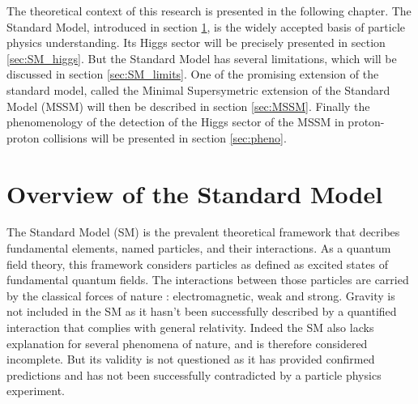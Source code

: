




The theoretical context of this research is presented in the following chapter. The Standard Model, introduced in section \ref{sec:SM}, is the widely accepted basis of particle physics understanding. Its Higgs sector will be precisely presented in section \ref{sec:SM_higgs}. But the Standard Model has several limitations, which will be discussed in section \ref{sec:SM_limits}. One of the promising extension of the standard model, called the Minimal Supersymetric extension of the Standard Model (MSSM) will then be described in section \ref{sec:MSSM}. Finally the phenomenology of the detection of the Higgs sector of the MSSM in proton-proton collisions will be presented in section \ref{sec:pheno}.

\section{Overview of the Standard Model}
\label{sec:SM}
The Standard Model (SM) is the prevalent theoretical framework that decribes fundamental elements, named particles, and their interactions. As a quantum field theory, this framework considers particles as defined as excited states of fundamental quantum fields. The interactions between those particles are carried by the classical forces of nature : electromagnetic, weak and strong. Gravity is not included in the SM as it hasn't been successfully described by a quantified interaction that complies with general relativity. Indeed the SM also lacks explanation for several phenomena of nature, and is therefore considered incomplete. But its validity is not questioned as it has provided confirmed predictions and has not been successfully contradicted by a particle physics experiment.\newline

